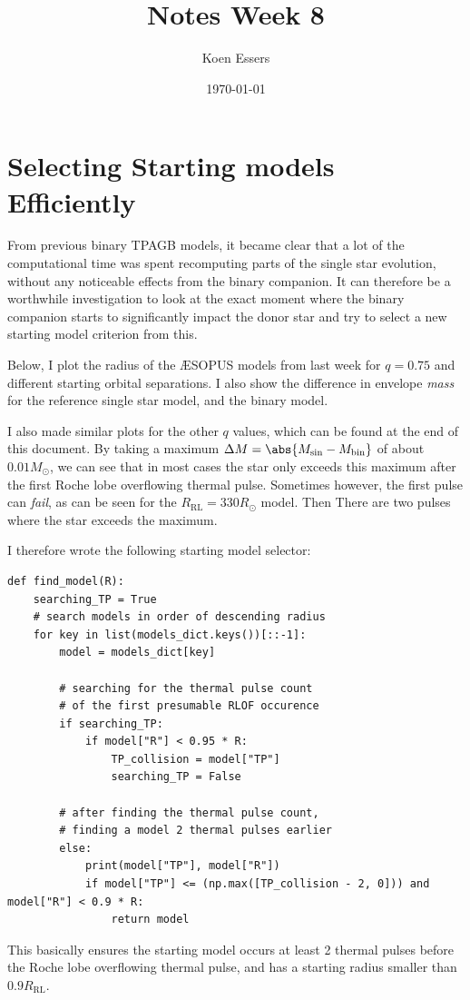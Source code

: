 \documentclass[a4paper,10pt]{article}
\title{Notes Week 8}
\author{Koen Essers}
\date{\today}
\begin{document}
\setuplayout
\section{Selecting Starting models Efficiently}

From previous binary TPAGB models, it became clear that a lot of the computational time was spent recomputing parts of the single star evolution, without any noticeable effects from the binary companion. It can therefore be a worthwhile investigation to look at the exact moment where the binary companion starts to significantly impact the donor star and try to select a new starting model criterion from this.

Below, I plot the radius of the \AE SOPUS models from last week for \(q = 0.75\) and different starting orbital separations. I also show the difference in envelope \emph{mass} for the reference single star model, and the binary model. 

\begin{figure}[ht]
    \centering
\end{figure}

I also made similar plots for the other \(q\) values, which can be found at the end of this document.
By taking a maximum \(\Delta M = \abs{M_\text{sin} - M_\text{bin}}\) of about \(0.01 M_\odot \), we can see that in most cases the star only exceeds this maximum after the first Roche lobe overflowing thermal pulse. Sometimes however, the first pulse can \emph{fail}, as can be seen for the \(R_\text{RL} = 330R_\odot \) model. Then There are two pulses where the star exceeds the maximum.

I therefore wrote the following starting model selector:
\begin{verbatim}
def find_model(R):
    searching_TP = True
    # search models in order of descending radius
    for key in list(models_dict.keys())[::-1]:
        model = models_dict[key]

        # searching for the thermal pulse count
        # of the first presumable RLOF occurence
        if searching_TP:
            if model["R"] < 0.95 * R:
                TP_collision = model["TP"]
                searching_TP = False

        # after finding the thermal pulse count,
        # finding a model 2 thermal pulses earlier
        else:
            print(model["TP"], model["R"])
            if model["TP"] <= (np.max([TP_collision - 2, 0])) and model["R"] < 0.9 * R:
                return model
\end{verbatim}
This basically ensures the starting model occurs at least 2 thermal pulses before the Roche lobe overflowing thermal pulse, and has a starting radius smaller than \(0.9R_\text{RL}\).
\end{document}
